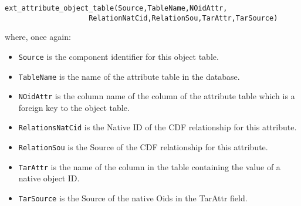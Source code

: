 \begin{verbatim}
ext_attribute_object_table(Source,TableName,NOidAttr,
                    RelationNatCid,RelationSou,TarAttr,TarSource)
\end{verbatim}
where, once again:
\begin{itemize}
\item
{\tt Source} is the component identifier for this object table.
\item
{\tt TableName} is the name of the attribute table in the database.
\item
{\tt NOidAttr} is the column name of the column of the attribute table which
  is a foreign key to the object table.
\item
{\tt RelationsNatCid} is the Native ID of the CDF relationship for this
  attribute.
\item
{\tt RelationSou} is the Source of the CDF relationship for this attribute.
\item
{\tt TarAttr} is the name of the column in the table containing the value of
  a native object ID.
\item
{\tt TarSource} is the Source of the native Oids in the TarAttr field.
\end{itemize}


